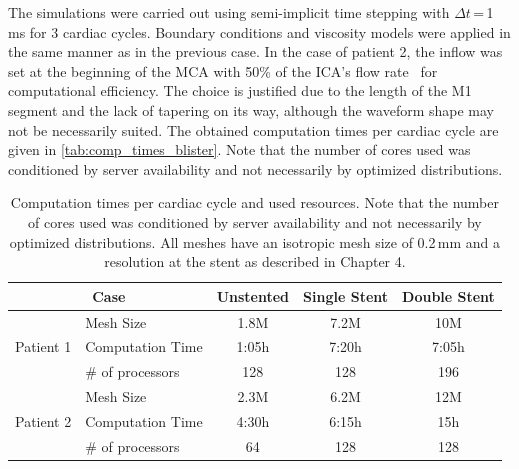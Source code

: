 The simulations were carried out using semi-implicit time stepping with $\Delta t$\,=\,1\,ms for 3 cardiac cycles. Boundary conditions and viscosity models were applied in the same manner as in the previous case. In the case of patient 2, the inflow was set at the beginning of the MCA with 50\% of the ICA's flow rate \,\cite{Zarrinkoob2015} for computational efficiency. The choice is justified due to the length of the M1 segment and the lack of tapering on its way, although the waveform shape may not be necessarily suited. The obtained computation times per cardiac cycle are given in \autoref{tab:comp_times_blister}. Note that the number of cores used was conditioned by server availability and not necessarily by optimized distributions.

\begin{table}[htb]
	\centering
	\renewcommand{\arraystretch}{1.3}
	\setlength{\tabcolsep}{6pt}
	\begin{tabular}{l l c c c}
		\hline
		\multicolumn{2}{c}{Case}   & Unstented        & Single Stent & Double Stent         \\
		\hline
		\multirow{3}{*}{Patient 1} & Mesh Size        & 1.8M         & 7.2M         & 10M   \\
		                           & Computation Time & 1:05h        & 7:20h        & 7:05h \\
		                           & \# of processors & 128          & 128          & 196   \\
		\hline
		\multirow{3}{*}{Patient 2} & Mesh Size        & 2.3M         & 6.2M         & 12M   \\
		                           & Computation Time & 4:30h        & 6:15h        & 15h   \\
		                           & \# of processors & 64           & 128          & 128   \\
		\hline
	\end{tabular}
	\caption[Computation times for uncoliable aneurysm simulations]{Computation times per cardiac cycle and used resources. Note that the number of cores used was conditioned by server availability and not necessarily by optimized distributions. All meshes have an isotropic mesh size of 0.2\,mm and a resolution at the stent as described in Chapter 4.}
	\label{tab:comp_times_blister}
\end{table}

